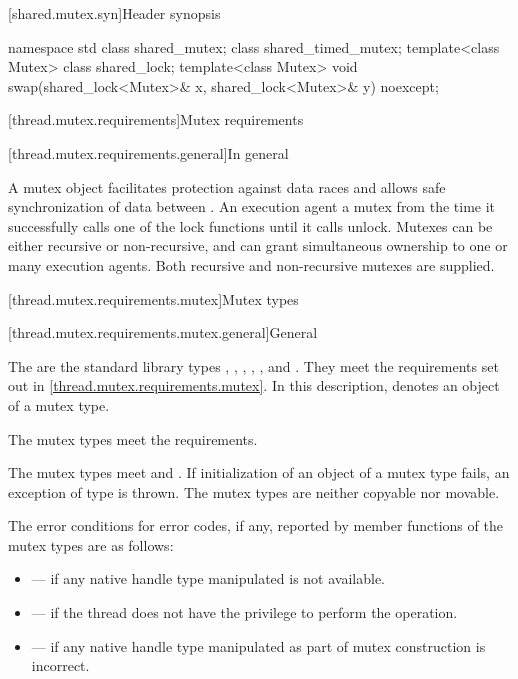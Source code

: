 [shared.mutex.syn]{Header  synopsis}

%
\begin{codeblock}
namespace std {
  class shared_mutex;
  class shared_timed_mutex;
  template<class Mutex> class shared_lock;
  template<class Mutex>
    void swap(shared_lock<Mutex>& x, shared_lock<Mutex>& y) noexcept;
}
\end{codeblock}

[thread.mutex.requirements]{Mutex requirements}

[thread.mutex.requirements.general]{In general}

\pnum
A mutex object facilitates protection against data races and allows safe synchronization of
data between .
An execution agent  a mutex from the time it successfully calls one of the
lock functions until it calls unlock. Mutexes can be either recursive or non-recursive, and can
grant simultaneous ownership to one or many execution agents. Both
recursive and non-recursive mutexes are supplied.

[thread.mutex.requirements.mutex]{Mutex types}

[thread.mutex.requirements.mutex.general]{General}

\pnum
The  are the standard library types ,
, , ,
, and .
They meet the requirements set out in \ref{thread.mutex.requirements.mutex}.
In this description,  denotes an object of a mutex type.
\begin{note}
The mutex types meet the  requirements.
\end{note}

\pnum
The mutex types meet  and .
If initialization of an object of a mutex type fails,
an exception of type  is thrown.
The mutex types are neither copyable nor movable.

\pnum
The error conditions for error codes, if any, reported by member functions of the mutex types
are as follows:
\begin{itemize}
\item {} --- if any native handle type manipulated is not available.
\item {} --- if the thread does not have the
privilege to perform the operation.
\item {} --- if any native handle type manipulated as part of mutex
construction is incorrect.
\end{itemize}

